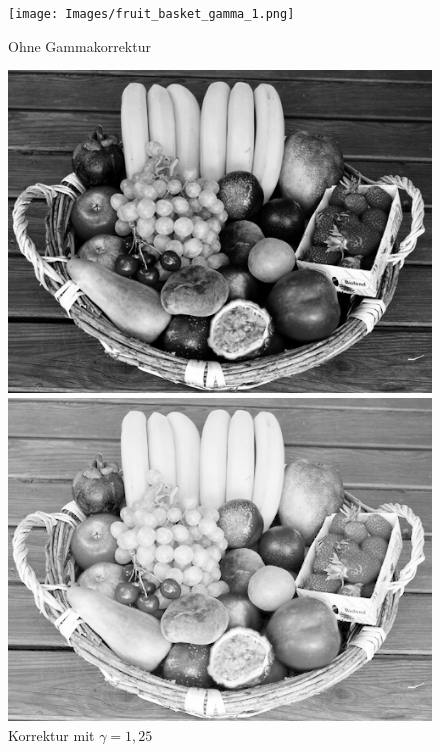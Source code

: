 \documentclass[course=erap]{aspdoc}
\begin{document}
\begin{figure}[h]
    \begin{minipage}{0.49\linewidth}
        \centering
        \texttt{[image: Images/fruit\_basket\_gamma\_1.png]}
        \caption{Ohne Gammakorrektur}
    \end{minipage}
    \centering
    \begin{minipage}{0.49\linewidth}
        \centering
        \includegraphics[scale=1.2]{Images/fruit_basket_gamma_1,25.png}
        \caption{Korrektur mit $\gamma = 1,25$}
    \end{minipage}
    \begin{minipage}{0.49\linewidth}
        \centering
        \includegraphics[scale=1.2]{Images/fruit_basket_gamma_0,5.png}

\end{minipage}
\end{figure}
\end{document}
